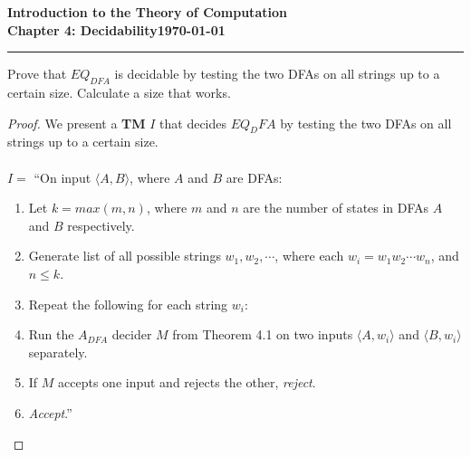 \documentclass[11pt]{article}
\newcommand{\dated}{\today}
\begin{document}
\textbf{Introduction to the Theory of
Computation}\hfill\textbf{\myname}\\[0.01in]
\textbf{Chapter 4: Decidability}\hfill\textbf{\dated}\\
\smallskip\hrule\bigskip

\begin{problem}{4.17}
Prove that $EQ_{DFA}$ is decidable by testing the two DFAs on all strings up to a certain size. Calculate a size that works.
\end{problem}

\begin{proof}
We present a \textbf{TM} $I$ that decides $EQ_DFA$ by testing the two DFAs on all strings up to a certain size.  \\
\\
$I =$ \textquotedblleft On input $\langle A, B \rangle$, where $A$ and $B$ are DFAs:
\begin{enumerate}
\item Let $k = max(m, n)$, where $m$ and $n$ are the number of states in DFAs $A$ and $B$ respectively.
\item Generate list of all possible strings $w_1, w_2, \cdots$, where each $w_i = w_1w_2 \cdots w_n$, and $n \leq k$.
\item Repeat the following for each string $w_i$:
\item \hspace*{0.5cm} Run the $A_{DFA}$ decider $M$ from Theorem 4.1 on two inputs $\langle A, w_i \rangle$ and $\langle B, w_i \rangle$ separately.
\item \hspace*{0.5cm} If $M$ accepts one input and rejects the other, \textit{reject}. 
\item \textit{Accept}.\textquotedblright
\end{enumerate}
\end{proof}
\end{document}
